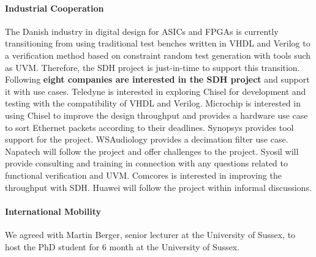 \documentclass[fleqn,12pt]{article}
\newcommand{\todo}[1]{{\color{red} TODO: #1}}
\begin{document}
%



\paragraph*{Industrial Cooperation}

The Danish industry in digital design for ASICs and FPGAs is currently transitioning from using traditional
test benches written in VHDL and Verilog to a verification method based on constraint random
test generation with tools such as UVM. Therefore, the SDH project is just-in-time to support this
transition.
%
Following {\bf eight companies are interested in the SDH project} and support it with use cases.
Teledyne is interested in exploring Chisel for development and testing with the compatibility of VHDL and Verilog.
Microchip is interested in using Chisel to improve the design throughput and
provides a hardware use case to sort Ethernet packets according to their deadlines.
Synopsys provides tool support for the project.
WSAudiology provides a decimation filter use case.
Napatech will follow the project and offer challenges to the project.
Syosil will provide consulting and training in connection with any questions related to functional verification and UVM.
Comcores is interested in improving the throughput with SDH.
Huawei will follow the project within informal discussions.


%

\paragraph{International Mobility}

We agreed with Martin Berger, senior lecturer at the University of Sussex, to host the PhD
student for 6 month at the University of Sussex.
\end{document}
